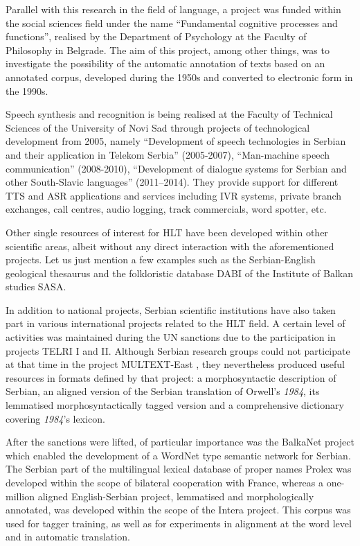 {\begin{multicols}{2}
Parallel with this research in the field of language, a project was funded within the social sciences field under the name “Fundamental cognitive processes and functions”, realised by the Department of Psychology at the Faculty of Philosophy in Belgrade. The aim of this project, among other things, was to investigate the possibility of the automatic annotation of texts based on an annotated corpus, \cite{SRB_KORPUS} developed during the 1950s and converted to electronic form in the 1990s. 

Speech synthesis and recognition is being realised at the Faculty of Technical Sciences of the University of Novi Sad through projects of technological development from 2005, namely “Development of speech technologies in Serbian and their application in Telekom Serbia” (2005-2007), “Man-machine speech communication” (2008-2010), “Development of dialogue systems for Serbian and other South-Slavic languages” (2011--2014). They provide support for different TTS and ASR applications and services including IVR systems, private branch exchanges, call centres, audio logging, track commercials, word spotter, etc.
 
Other single resources of interest for HLT have been developed within other scientific areas, albeit without any direct interaction with the aforementioned projects. Let us just mention a few examples such as the Serbian-English geological thesaurus \cite{RGF} and the folkloristic database DABI of the Institute of Balkan studies SASA. \cite{BALKANINSTITUT} 

In addition to national projects, Serbian scientific institutions have also taken part in various international projects related to the HLT field. A certain level of activities was maintained during the UN sanctions due to the participation in projects TELRI I and II. \cite{TELRI} Although Serbian research groups could not participate at that time in the project MULTEXT-East \cite{NL}, they nevertheless produced useful resources in formats defined by that project: a morphosyntactic description of Serbian, an aligned version of the Serbian translation of Orwell’s \textit{1984}, its lemmatised morphosyntactically tagged version and a comprehensive dictionary covering \textit{1984}'s lexicon. 

After the sanctions were lifted, of particular importance was the BalkaNet \cite{CORDIS} project which enabled the development of a WordNet type semantic network for Serbian. The Serbian part of the multilingual lexical database of proper names Prolex \cite{CNRTL} was developed within the scope of bilateral cooperation with France, whereas a one-million aligned English-Serbian project, lemmatised and morphologically annotated, was developed within the scope of the Intera project.  This corpus was used for tagger training, as well as for experiments in alignment at the word level and in automatic translation.
 

\end{multicols}}
